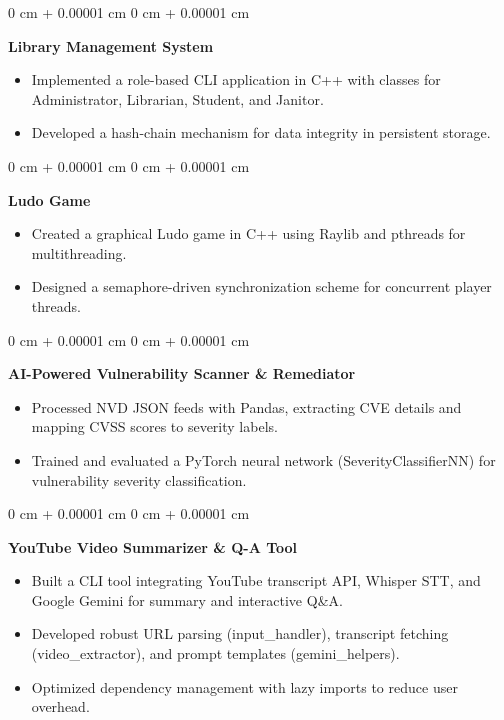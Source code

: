 \documentclass[10pt, letterpaper]{article}
\newenvironment{highlights}{
    \begin{itemize}[
        topsep=0.10 cm,
        parsep=0.10 cm,
        partopsep=0pt,
        itemsep=0pt,
        leftmargin=0 cm + 10pt
    ]
}{
    \end{itemize}
}
\newenvironment{onecolentry}{
    \begin{adjustwidth}{
        0 cm + 0.00001 cm
    }{
        0 cm + 0.00001 cm
    }
}{
    \end{adjustwidth}
}
\begin{document}
\begin{onecolentry}
    \textbf{Library Management System}
    \begin{highlights}
        \item Implemented a role-based CLI application in C++ with classes for Administrator, Librarian, Student, and Janitor.
        \item Developed a hash-chain mechanism for data integrity in persistent storage.
    \end{highlights}
\end{onecolentry}

\begin{onecolentry}
    \textbf{Ludo Game}
    \begin{highlights}
        \item Created a graphical Ludo game in C++ using Raylib and pthreads for multithreading.
        \item Designed a semaphore-driven synchronization scheme for concurrent player threads.
    \end{highlights}
\end{onecolentry}

\begin{onecolentry}
    \textbf{AI-Powered Vulnerability Scanner \& Remediator}
    \begin{highlights}
        \item Processed NVD JSON feeds with Pandas, extracting CVE details and mapping CVSS scores to severity labels.
        \item Trained and evaluated a PyTorch neural network (SeverityClassifierNN) for vulnerability severity classification.
    \end{highlights}
\end{onecolentry}

\begin{onecolentry}
    \textbf{YouTube Video Summarizer \& Q-A Tool}
    \begin{highlights}
        \item Built a CLI tool integrating YouTube transcript API, Whisper STT, and Google Gemini for summary and interactive Q\&A.
        \item Developed robust URL parsing (input\_handler), transcript fetching (video\_extractor), and prompt templates (gemini\_helpers).
        \item Optimized dependency management with lazy imports to reduce user overhead.
    \end{highlights}
\end{onecolentry}
\end{document}
